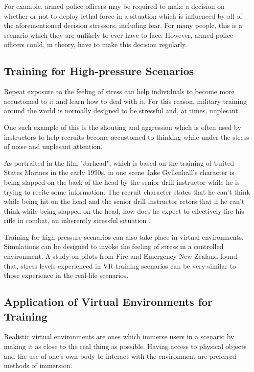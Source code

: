 \documentclass[12pt]{article}
\begin{document}
For example, armed police officers may be required to make a decision on whether or not to deploy lethal force in a situation which is influenced by all of the aforementioned decision stressors, including fear. For many people, this is a scenario which they are unlikely to ever have to face. However, armed police officers could, in theory, have to make this decision regularly. 

\subsection{Training for High-pressure Scenarios}

Repeat exposure to the feeling of stress can help individuals to become more accustomed to it and learn how to deal with it. For this reason, military training around the world is normally designed to be stressful and, at times, unplesant. 

One such example of this is the shouting and aggression which is often used by instructors to help recruits become accustomed to thinking while under the stress of noise and unplesant attention.

As portraited in the film "Jarhead", which is based on the training of United States Marines in the early 1990s, in one scene Jake Gyllenhall's character is being slapped on the back of the head by the senior drill instructor while he is trying to recite some information. The recruit character states that he can't think while being hit on the head and the senior drill instructor retors that if he can't think while being slapped on the head, how does he expect to effectively fire his rifle in combat, an inherently stressful situation \cite{jarhead2005}.

Training for high-pressure scenarios can also take place in virtual environments. Simulations can be designed to invoke the feeling of stress in a controlled environment. A study on pilots from Fire and Emergency New Zealand found that, stress levels experienced in VR training scenarios can be very similar to those experience in the real-life scenarios. \cite{clifford2019creating}

\subsection{Application of Virtual Environments for Training}

Realistic virtual environments are ones which immerse users in a scenario by making it as close to the real thing as possible. Having access to physical objects and the use of one's own body to interact with the environment are preferred methods of immersion. \cite{clifford2018effect}
\end{document}
